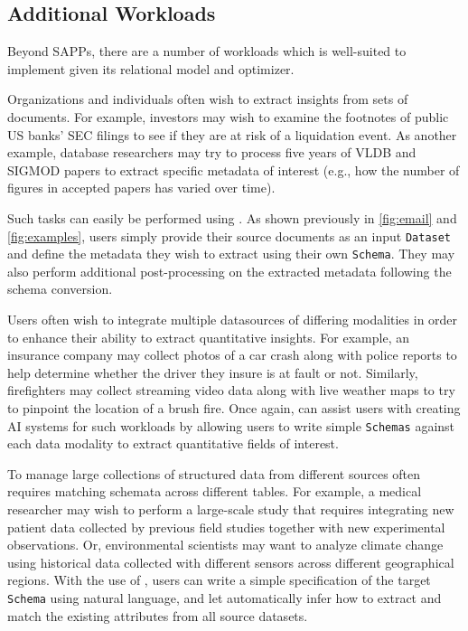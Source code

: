 
\subsection{Additional Workloads}
Beyond SAPPs, there are a number of workloads which \system{} is well-suited to implement given its relational model and optimizer.

 Organizations and individuals often wish to extract insights from sets of documents. For example, investors may wish to examine the footnotes of public US banks' SEC filings to see if they are at risk of a liquidation event. As another example, database researchers may try to process five years of VLDB and SIGMOD papers to extract specific metadata of interest (e.g., how the number of figures in accepted papers has varied over time).

Such tasks can easily be performed using \system{}. As shown previously in \autoref{fig:email} and \autoref{fig:examples}, users simply provide their source documents as an input {\tt Dataset} and define the metadata they wish to extract using their own {\tt Schema}. They may also perform additional post-processing on the extracted metadata following the schema conversion.

 Users often wish to integrate multiple datasources of differing modalities in order to enhance their ability to extract quantitative insights. For example, an insurance company may collect photos of a car crash along with police reports to help determine whether the driver they insure is at fault or not. Similarly, firefighters may collect streaming video data along with live weather maps to try to pinpoint the location of a brush fire. Once again, \system{} can assist users with creating AI systems for such workloads by allowing users to write simple {\tt Schemas} against each data modality to extract quantitative fields of interest.

To manage large collections of structured data from different sources often requires matching schemata across different tables.
For example, a medical researcher may wish to perform a large-scale study that requires integrating new patient data collected by previous field studies together with new experimental observations.
Or, environmental scientists may want to analyze climate change using historical data collected with different sensors across different geographical regions.
With the use of \system{}, users can write a simple specification of the target {\tt Schema} using natural language, and let \system{} automatically infer how to extract and match the existing attributes from all source datasets.


